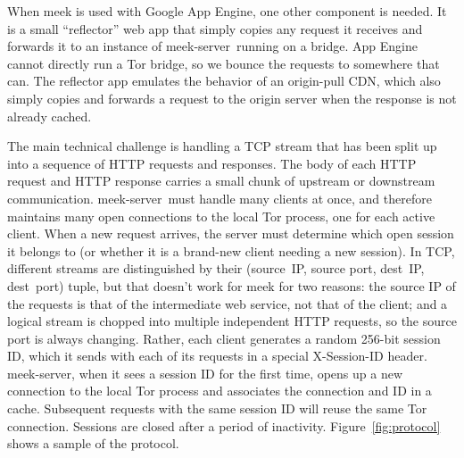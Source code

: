 \documentclass[conference]{IEEEtran}
\def\meekserver{\mbox{meek-server}}
\begin{document}
When meek is used with Google App Engine, one other component is needed.
It is a small ``reflector'' web app that simply copies any request
it receives and forwards it to an instance of \meekserver\ running on a bridge.
App Engine cannot directly run a Tor bridge,
so we bounce the requests to somewhere that can.
The reflector app emulates the behavior of an origin-pull CDN,
which also simply copies and forwards a request to the origin server
when the response is not already cached.

The main technical challenge is handling a TCP stream
that has been split up into a sequence of HTTP requests and responses.
The body of each HTTP request and HTTP response carries
a small chunk of upstream or downstream communication.
\meekserver\ must handle many clients at once,
and therefore maintains many open connections to the local Tor process,
one for each active client.
When a new request arrives, the server must determine which
open session it belongs to
(or whether it is a brand-new client needing a new session).
In TCP, different streams are distinguished by their
(source~IP, source port, dest~IP, dest~port) tuple,
but that doesn't work for meek for two reasons:
the source IP of the requests is that of the intermediate web service,
not that of the client;
and a logical stream is chopped into multiple independent HTTP requests,
so the source port is always changing.
Rather, each client generates a random 256-bit session ID,
which it sends with each of its requests in a special
X-Session-ID header.
\meekserver, when it sees a session ID for the first time,
opens up a new connection to the local Tor process
and associates the connection and ID in a cache.
Subsequent requests with the
same session ID will reuse the same Tor connection.
Sessions are closed after a period of inactivity.
Figure~\ref{fig:protocol} shows a sample of the protocol.
\end{document}
